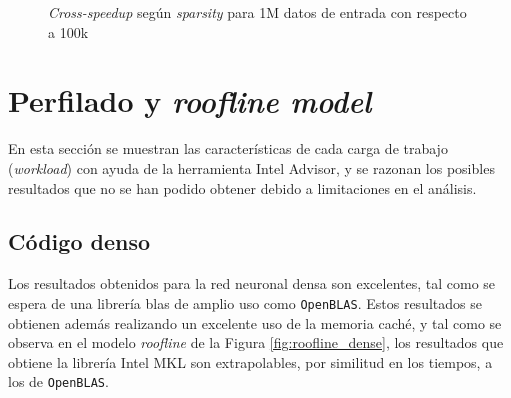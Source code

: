 \begin{figure}[htpb]
    \centering
    \caption{\textit{Cross-speedup} según \textit{sparsity} para 1M datos de entrada con respecto a 100k}
    \label{fig:cross_speedup_1M_100k}
\end{figure}

\section{Perfilado y \textit{roofline model}}
\label{sec:perfilado_roofline}
En esta sección se muestran las características de cada carga de trabajo (\textit{workload}) con ayuda de la herramienta Intel Advisor, y se razonan los posibles resultados que no se han podido obtener debido a limitaciones en el análisis.

\subsection{Código denso}
\label{ssec:codigo_denso_perfilado}
Los resultados obtenidos para la red neuronal densa son excelentes, tal como se espera de una librería \acrshort{blas} de amplio uso como \texttt{OpenBLAS}. Estos resultados se obtienen además realizando un excelente uso de la memoria caché, y tal como se observa en el modelo \textit{roofline} de la Figura \ref{fig:roofline_dense}, los resultados que obtiene la librería Intel MKL son extrapolables, por similitud en los tiempos, a los de \texttt{OpenBLAS}.

